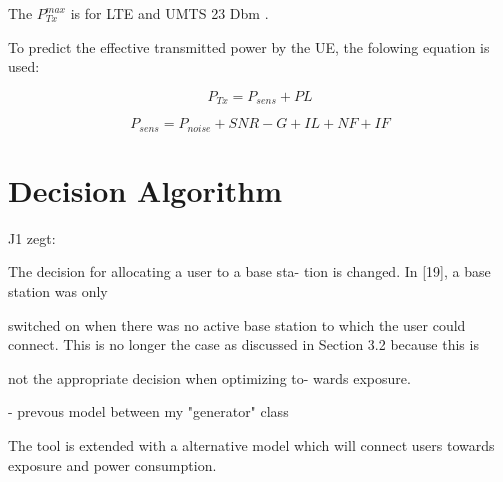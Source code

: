 The $P^{max}_{Tx}$ is for LTE and UMTS 23 Dbm \cite{J11_maxTpxUE, J10_RDP}.

To predict the effective transmitted power by the \gls{UE}, the folowing equation is used:

\begin{equation}
P_{Tx} = P_{sens} + PL
\label{eq:ptx}
\end{equation}

\begin{equation}
P_{sens} = P_{noise} + SNR - G + IL + NF + IF
\label{eq:calculatepsens}
\end{equation}


\section{Decision Algorithm}

J1 zegt:

The decision for allocating a user to a base sta-
tion is changed. In [19], a base station was only

switched on when there was no active base station
to which the user could connect. This is no longer
the case as discussed in Section 3.2 because this is

not the appropriate decision when optimizing to-
wards exposure.


- prevous model between my "generator" class



The tool is extended with a alternative model which will connect users towards exposure and power consumption.
